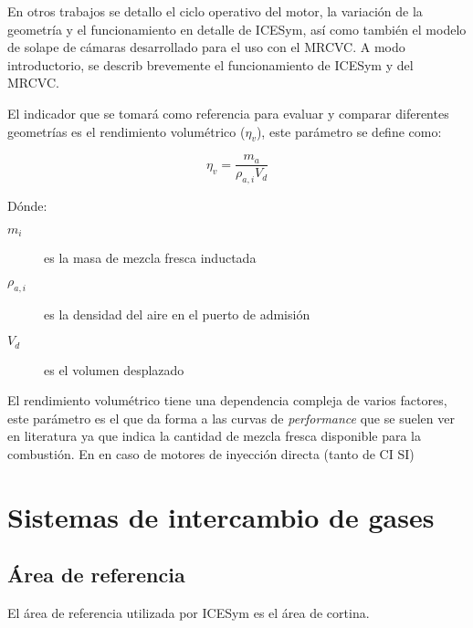 
En otros trabajos se detallo el ciclo operativo del motor, la variación de la
geometría y el funcionamiento en detalle de ICESym, así como también el modelo
de solape de cámaras desarrollado para el uso con el MRCVC.
%
A modo introductorio, se describ brevemente el funcionamiento de ICESym y del
MRCVC.

%
%
%
%

El indicador que se tomará como referencia para evaluar y comparar diferentes
geometrías es el rendimiento volumétrico ($\eta_v$), este parámetro se define
como:

\begin{equation}
    \eta_v = \frac{m_a}{\rho_{a,i}V_d}
\end{equation}

Dónde:
%
\begin{description}
    \item[$m_i$] es la masa de mezcla fresca inductada
    \item[$\rho_{a,i}$] es la densidad del aire en el puerto de admisión
    \item[$V_d$] es el volumen desplazado
\end{description}

El rendimiento volumétrico tiene una dependencia compleja de varios factores,
este parámetro es el que da forma a las curvas de \emph{performance} que se
suelen ver en literatura ya que indica la cantidad de mezcla fresca disponible
para la combustión. 
%
En en caso de motores de inyección directa (tanto de CI SI)

\section{Sistemas de intercambio de gases}
%
\subsection{Área de referencia}
%
El área de referencia utilizada por ICESym es el área de cortina.

